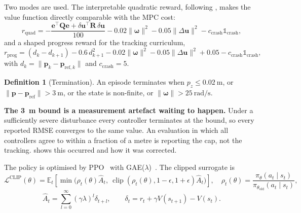 \documentclass[11pt,a4paper,twoside,openright]{report}
\makeatletter
\renewcommand{\subsection}{\FloatBarrier\old@subsection}}
\newcommand{\E}{\mathbb{E}}
\newcommand{\clip}{\operatorname{clip}}
\newcommand{\transp}{^{\!\top}}
\renewcommand{\vec}[1]{\bm{#1}}
\newcommand{\mat}[1]{\bm{#1}}
\newcommand{\inp}{\vec{u}}
\newcommand{\err}{\vec{e}}
\newcommand{\bodyrate}{\vec{\omega}}
\newcommand{\refsym}{\mathrm{ref}}
\theoremstyle{plain}
\theoremstyle{definition}
\newtheorem{definition}[theorem]{Definition}
\theoremstyle{remark}
\makeatother
\begin{document}
	Two modes are used. The interpretable quadratic reward, following
	\cite{romero2024acmpc}, makes the value function directly comparable with the
	MPC cost:
	\begin{equation}
		r_\mathrm{quad}=-\frac{\err\transp\mat Q\err+\delta\inp\transp\mat R\,\delta\inp}{100}
		-0.02\|\bodyrate\|^2-0.05\|\Delta\inp\|^2-c_\mathrm{crash}\mathbb 1_\mathrm{crash},
		\label{eq:rquad}
	\end{equation}
	and a shaped progress reward for the tracking curriculum,
	\begin{equation}
		r_\mathrm{prog}=(d_k-d_{k+1})-0.6\,d_{k+1}^2-0.02\|\bodyrate\|^2
		-0.05\|\Delta\inp\|^2+0.05-c_\mathrm{crash}\mathbb 1_\mathrm{crash},
		\label{eq:rprog}
	\end{equation}
	with $d_k=\|\vec p_k-\vec p_{\refsym,k}\|$ and $c_\mathrm{crash}=5$.

	\begin{definition}[Termination]
		\label{def:crash}
		An episode terminates when $p_z\le\SI{0.02}{\metre}$, or
		$\|\vec p-\vec p_\refsym\|>\SI{3}{\metre}$, or the state is non-finite, or
		$\|\bodyrate\|>\SI{25}{\radian\per\second}$.
	\end{definition}

	\begin{cautionbox}
		\textbf{The \SI{3}{\metre} bound is a measurement artefact waiting to happen.}
		Under a sufficiently severe disturbance every controller terminates at the bound,
		so every reported RMSE converges to the same value. An evaluation in which all
		controllers agree to within a fraction of a metre is reporting the cap, not the
		tracking.  shows this occurred and how it was corrected.
	\end{cautionbox}

	\subsection{Policy optimisation}

	The policy is optimised by PPO~\cite{schulman2017ppo} with
	GAE($\lambda$)~\cite{schulman2016gae}. The clipped surrogate is
	\begin{equation}
		\mathcal L^\mathrm{CLIP}(\theta)=\E_t\!\left[
		\min\!\big(\rho_t(\theta)\hat A_t,\
		\clip(\rho_t(\theta),1-\epsilon,1+\epsilon)\hat A_t\big)\right],
		\quad
		\rho_t(\theta)=\frac{\pi_\theta(a_t\mid s_t)}{\pi_{\theta_\mathrm{old}}(a_t\mid s_t)},
		\label{eq:ppo}
	\end{equation}
	\begin{equation}
		\hat A_t=\sum_{l=0}^{\infty}(\gamma\lambda)^l\delta_{t+l},
		\qquad \delta_t=r_t+\gamma V(s_{t+1})-V(s_t).
		\label{eq:gae}
	\end{equation}
\end{document}
